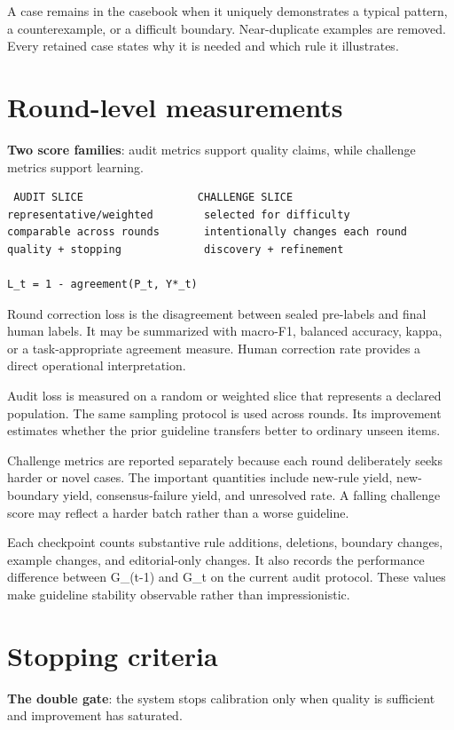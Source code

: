 A case remains in the casebook when it uniquely demonstrates a typical pattern, a counterexample, or a difficult boundary. Near-duplicate examples are removed. Every retained case states why it is needed and which rule it illustrates.


\section{Round-level measurements}
\textbf{Two score families}: audit metrics support quality claims, while challenge metrics support learning.

\begin{verbatim}
 AUDIT SLICE                  CHALLENGE SLICE
representative/weighted        selected for difficulty
comparable across rounds       intentionally changes each round
quality + stopping             discovery + refinement

L_t = 1 - agreement(P_t, Y*_t)
\end{verbatim}
Round correction loss is the disagreement between sealed pre-labels and final human labels. It may be summarized with macro-F1, balanced accuracy, kappa, or a task-appropriate agreement measure. Human correction rate provides a direct operational interpretation.

Audit loss is measured on a random or weighted slice that represents a declared population. The same sampling protocol is used across rounds. Its improvement estimates whether the prior guideline transfers better to ordinary unseen items.

Challenge metrics are reported separately because each round deliberately seeks harder or novel cases. The important quantities include new-rule yield, new-boundary yield, consensus-failure yield, and unresolved rate. A falling challenge score may reflect a harder batch rather than a worse guideline.

Each checkpoint counts substantive rule additions, deletions, boundary changes, example changes, and editorial-only changes. It also records the performance difference between G_(t-1) and G_t on the current audit protocol. These values make guideline stability observable rather than impressionistic.


\section{Stopping criteria}
\textbf{The double gate}: the system stops calibration only when quality is sufficient and improvement has saturated.

